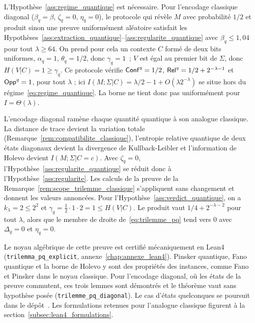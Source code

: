\begin{sloppypar}
\begin{remark}
\label{rem:scope_trilemme_pq}
L'Hypoth\`ese~\ref{ass:regime_quantique} est n\'ecessaire. Pour
l'encodage classique diagonal ($\beta_q = \beta$, $\zeta_q = 0$,
$\eta_q = 0$), le protocole qui r\'ev\`ele $M$ avec probabilit\'e $1/2$ et
produit sinon une preuve uniform\'ement al\'eatoire satisfait les
Hypoth\`eses~\ref{ass:extraction_quantique}--\ref{ass:regularite_quantique}
avec $\beta_q \leq 1{,}04$ pour tout $\lambda \geq 64$. On prend pour cela un contexte $C$ form\'e
de deux bits uniformes, $\alpha_q = 1$, $\theta_q = 1/2$, donc $\gamma_q = 1$~;
$V$ est \'egal au premier bit de $\Sigma$, donc $H(V|C) = 1 \geq \gamma_q$. Ce protocole v\'erifie
$\mathsf{Conf}^q = 1/2$, $\mathsf{Rel}^q = 1/2 + 2^{-\lambda-1}$ et $\mathsf{Opp}^q = 1$, pour tout
$\lambda$ ; ici
$I(M;\Sigma|C) = \lambda/2 - 1 + O(\lambda 2^{-\lambda})$ se situe hors
du r\'egime~\eqref{eq:regime_quantique}. La borne ne tient donc pas
uniform\'ement pour $I = \Theta(\lambda)$.
\end{remark}

\begin{Preuve}
L'encodage diagonal ram\`ene chaque quantit\'e quantique \`a son analogue
classique. La distance de trace devient la variation totale
(Remarque~\ref{rem:compatibilite_classique}), l'entropie relative quantique de
deux \'etats diagonaux devient la divergence de Kullback-Leibler et l'information
de Holevo devient $I(M;\Sigma|C=c)$. Avec $\zeta_q = 0$,
l'Hypoth\`ese~\ref{ass:regularite_quantique} se r\'eduit donc \`a
l'Hypoth\`ese~\ref{ass:regularite}. Les calculs de la preuve de la
Remarque~\ref{rem:scope_trilemme_classique} s'appliquent sans changement et
donnent les valeurs annonc\'ees. Pour l'Hypoth\`ese~\ref{ass:verdict_quantique},
on a $k_\lambda = 2 \leq 2^{2}$ et $\gamma_q = \tfrac12 \cdot 1 \cdot 2 = 1 \leq H(V|C)$.
Le produit vaut $1/4 + 2^{-\lambda-2}$ pour tout $\lambda$, alors que le membre de
droite de~\eqref{eq:trilemme_pq} tend vers $0$ avec $\Delta_q = 0$ et $\eta_q = 0$.
\end{Preuve}

\begin{remark}
\label{rem:statut_verification_pq}
Le noyau alg\'ebrique de cette preuve est certifi\'e m\'ecaniquement en Lean4
(\texttt{trilemma\_pq\_explicit}, annexe~\ref{chap:annexe_lean4}). Pinsker quantique, Fano
quantique et la borne de Holevo y sont des propri\'et\'es des instances, comme Fano et Pinsker
dans le noyau classique. Pour l'encodage diagonal, o\`u les \'etats de la preuve commutent, ces
trois lemmes sont d\'emontr\'es et le th\'eor\`eme vaut sans hypoth\`ese pos\'ee
(\texttt{trilemme\_pq\_diagonal}). Le cas d'\'etats quelconques se poursuit dans le
d\'ep\^ot~\cite{CROTrilemmaDepot}. Les formulations
retenues pour l'analogue classique figurent \`a la
section~\ref{subsec:lean4_formulations}.
\end{remark}


\end{sloppypar}
